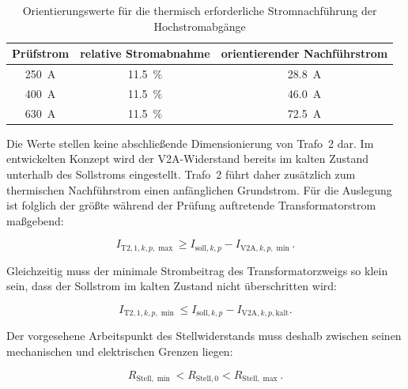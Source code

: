 \begin{table}[H]
    \centering
    \caption{Orientierungswerte für die thermisch erforderliche
    Stromnachführung der Hochstromabgänge}
    \label{tab:orientierungswerte_nachfuehrstrom}
    \begin{tabular}{ccc}
        \toprule
        Prüfstrom &
        relative Stromabnahme &
        orientierender Nachführstrom \\
        \midrule
        \SI{250}{\ampere} & \SI{11.5}{\percent} & \SI{28.8}{\ampere} \\
        \SI{400}{\ampere} & \SI{11.5}{\percent} & \SI{46.0}{\ampere} \\
        \SI{630}{\ampere} & \SI{11.5}{\percent} & \SI{72.5}{\ampere} \\
        \bottomrule
    \end{tabular}
\end{table}

Die Werte stellen keine abschließende Dimensionierung von Trafo~2
dar. Im entwickelten Konzept wird der V2A-Widerstand bereits im
kalten Zustand unterhalb des Sollstroms eingestellt. Trafo~2 führt
daher zusätzlich zum thermischen Nachführstrom einen anfänglichen
Grundstrom. Für die Auslegung ist folglich der größte während der
Prüfung auftretende Transformatorstrom maßgebend:

\begin{equation}
    I_{\mathrm{T2},1,k,p,\max}
    \geq
    I_{\mathrm{soll},k,p}
    -
    I_{\mathrm{V2A},k,p,\min}.
    \label{eq:auslegungsbedingung_trafo2_hochstrom}
\end{equation}

Gleichzeitig muss der minimale Strombeitrag des Transformatorzweigs
so klein sein, dass der Sollstrom im kalten Zustand nicht
überschritten wird:

\begin{equation}
    I_{\mathrm{T2},1,k,p,\min}
    \leq
    I_{\mathrm{soll},k,p}
    -
    I_{\mathrm{V2A},k,p,\mathrm{kalt}}.
    \label{eq:auslegungsbedingung_trafo2_minimalstrom}
\end{equation}

Der vorgesehene Arbeitspunkt des Stellwiderstands muss deshalb
zwischen seinen mechanischen und elektrischen Grenzen liegen:

\begin{equation}
    R_{\mathrm{Stell},\min}
    <
    R_{\mathrm{Stell},0}
    <
    R_{\mathrm{Stell},\max}.
    \label{eq:arbeitspunkt_stellwiderstand}
\end{equation}

